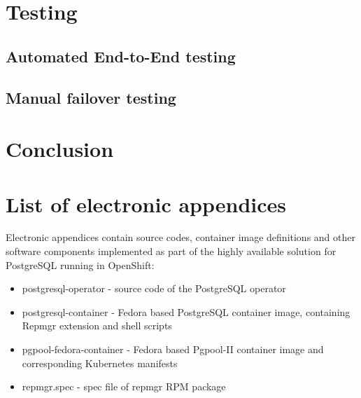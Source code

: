 \documentclass[
  digital, %
  twoside, %
  table,   %
  lof,     %
  lot,     %
]{fithesis3}
\begin{document}
\chapter{Testing} \label{chap:testing}

\section{Automated End-to-End testing}

\section{Manual failover testing}

\chapter{Conclusion} \label{chap:conclusion}

\appendix %
\chapter{List of electronic appendices}
Electronic appendices contain source codes, container image definitions and other software components implemented as part of the highly available solution for PostgreSQL running in OpenShift:
\begin{itemize}
  \item postgresql-operator - source code of the PostgreSQL operator
  \item postgresql-container - Fedora based PostgreSQL container image, containing Repmgr extension and shell scripts
  \item pgpool-fedora-container - Fedora based Pgpool-II container image and corresponding Kubernetes manifests
  \item repmgr.spec - spec file of repmgr RPM package
\end{itemize}
\end{document}
